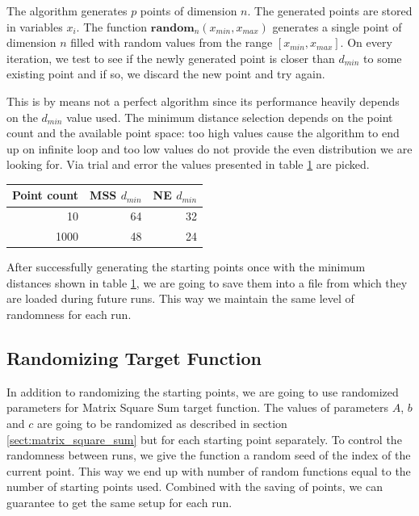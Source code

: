 \documentclass[a4paper,english,titlepage,12pt]{article}
\begin{document}
The algorithm generates $p$ points of dimension $n$. The generated points are stored in variables $x_i$. The function $\mathbf{random}_n(x_{min}, x_{max})$ generates a single point of dimension $n$ filled with random values from the range $[x_{min}, x_{max}]$. On every iteration, we test to see if the newly generated point is closer than $d_{min}$ to some existing point and if so, we discard the new point and try again.

This is by means not a perfect algorithm since its performance heavily depends on the $d_{min}$ value used. The minimum distance selection depends on the point count and the available point space: too high values cause the algorithm to end up on infinite loop and too low values do not provide the even distribution we are looking for. Via trial and error the values presented in table \ref{tab:dmin_values} are picked.

\begin{table}[H]
\centering
{}
\label{tab:dmin_values}
\begin{tabular}{|r|r|r|}
\hline
\rowcolor[HTML]{C0C0C0} 
Point count                       & MSS $d_{min}$ & NE $d_{min}$ \\ \hline
\cellcolor[HTML]{EFEFEF}10   & 64           & 32          \\ \hline
\cellcolor[HTML]{EFEFEF}1000 & 48           & 24          \\ \hline
\end{tabular}
\end{table}

After successfully generating the starting points once with the minimum distances shown in table \ref{tab:dmin_values}, we are going to save them into a file from which they are loaded during future runs. This way we maintain the same level of randomness for each run.

\subsection{Randomizing Target Function}

In addition to randomizing the starting points, we are going to use randomized parameters for Matrix Square Sum target function. The values of parameters $A$, $b$ and $c$ are going to be randomized as described in section \ref{sect:matrix_square_sum} but for each starting point separately. To control the randomness between runs, we give the function a random seed of the index of the current point. This way we end up with number of random functions equal to the number of starting points used. Combined with the saving of points, we can guarantee to get the same setup for each run.
\end{document}

